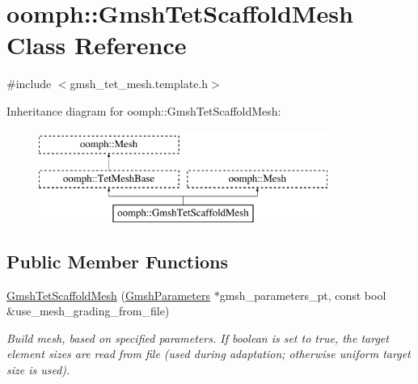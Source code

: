 \hypertarget{classoomph_1_1GmshTetScaffoldMesh}{}\section{oomph\+:\+:Gmsh\+Tet\+Scaffold\+Mesh Class Reference}
\label{classoomph_1_1GmshTetScaffoldMesh}


{\ttfamily \#include $<$gmsh\+\_\+tet\+\_\+mesh.\+template.\+h$>$}

Inheritance diagram for oomph\+:\+:Gmsh\+Tet\+Scaffold\+Mesh\+:\begin{figure}[H]
\begin{center}
\leavevmode
\includegraphics[height=3.000000cm]{classoomph_1_1GmshTetScaffoldMesh}
\end{center}
\end{figure}
\subsection*{Public Member Functions}
\begin{DoxyCompactItemize}
\item 
\hyperlink{classoomph_1_1GmshTetScaffoldMesh_a16430cc97edb1f4ec0eab6cfa5b94563}{Gmsh\+Tet\+Scaffold\+Mesh} (\hyperlink{classoomph_1_1GmshParameters}{Gmsh\+Parameters} $\ast$gmsh\+\_\+parameters\+\_\+pt, const bool \&use\+\_\+mesh\+\_\+grading\+\_\+from\+\_\+file)
\begin{DoxyCompactList}\small\item\em Build mesh, based on specified parameters. If boolean is set to true, the target element sizes are read from file (used during adaptation; otherwise uniform target size is used). \end{DoxyCompactList}\end{DoxyCompactItemize}
